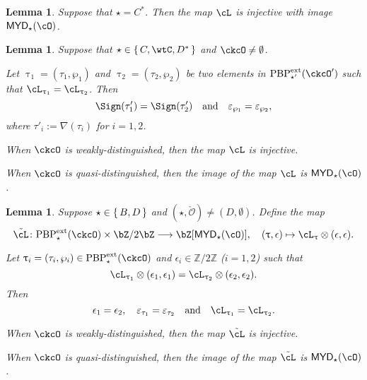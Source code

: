 \documentclass[12pt,a4paper]{amsart}
\newcommand{\AC}{\mathrm{AC}}
\def\MYD{{\mathsf{MYD}}}
\newcommand{\CO}{{\mathcal {O}}}
\newcommand{\Z}{\mathbb{Z}}
\def\DD{\nabla}
\numberwithin{equation}{section}
\newtheorem{lem}[thm]{Lemma}
\theoremstyle{remark}
\def\PBPe{\mathrm{PBP}^{\mathrm{ext}}}
\def\PBPes{\mathrm{PBP}^{\mathrm{ext}}_{\star}}
\def\PBPesp{\mathrm{PBP}^{\mathrm{ext}}_{\star'}}
\def\ckcOp{\ckcO^{\prime}}
\def\cOp{\cO^{\prime}}
\begin{document}
\begin{lem}\label{lem:C*}
Suppose that $\star = C^{*}$. Then the map $\acm$ 
        is injective with image $\MYD_{\star}(\cO)$.
\end{lem}
\begin{lem}\label{lem:C}
  Suppose that $\star \in \set{C,\wtC,D^{*}}$ and $\ckcO\neq \emptyset$. 
  \begin{enuma}
    \item Let $\uptau_{1} = (\tau_{1},\wp_{1})$ and
    $\uptau_{2}=(\tau_{2},\wp_{2})$ be two elements in $\PBPesp(\ckcOp)$ such
    that $\ac_{\uptau_{1}} =  \ac_{\uptau_{2}}$. Then
    \[
      \Sign(\tau'_{1})=\Sign(\tau'_{2}) \quad \text{and} \quad
    \varepsilon_{\wp_{1}}=\varepsilon_{\wp_{2}}, \]
    where $\tau'_{i} :=
    \DD(\tau_{i})$ for $i=1,2$.
    \item When $\ckcO$ is weakly-distinguished, then the map $\acm$ is injective.
    \item When $\ckcO$ is quasi-distinguished, then the image of the map $\acm$ is $\MYD_{\star}(\cO)$.
  \end{enuma}
\end{lem}


\begin{lem}\label{lem:BD}
Suppose $\star \in \set{B,D}$ and $(\star, \check \CO)\neq (D, \emptyset)$. Define the map
 \[
    \acme \colon
    \PBPes( \ckcO )\times \bZ/2\bZ \longrightarrow \bZ[\MYD_{\star}(\cO)],\quad
    (\uptau,\epsilon) \mapsto \ac_{\uptau}\otimes (\epsilon, \epsilon).
  \]
  \begin{enuma}
  \item Let $\uptau_i=(\tau_i, \wp_i)\in \PBPe_\star(\ckcO)$ and
  $\epsilon_i\in \Z/2\Z$ ($i=1,2$) such that
  \[
    \ac_{\uptau_1}\lotimes (\epsilon_{1},\epsilon_{1})= \ac_{\uptau_2}\lotimes( \epsilon_{2},\epsilon_{2} ).
  \]
  Then
  \[
    \epsilon_1=\epsilon_2,\quad \varepsilon_{\tau_1}=\varepsilon_{\tau_2} \AND \ac_{\uptau_{1}}=\ac_{\uptau_{2}}.
  \]

  \item When $\ckcO$ is weakly-distinguished, then the map $\acme$ is injective.
  \item When $\ckcO$ is quasi-distinguished, then the image of the map $\acme$ is $\MYD_{\star}(\cO)$.
\end{enuma}
\end{lem}
\end{document}
